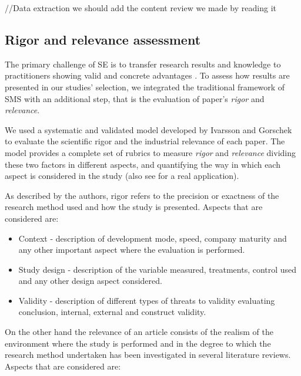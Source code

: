 \documentclass[final,5p,times,twocolumn]{elsarticle}
\begin{document}
//Data extraction we should add the content review we made by reading it




\subsection{Rigor and relevance assessment} %
\label{sub:rigor_and_relevance}

The primary challenge of SE is to transfer research results and knowledge to practitioners showing valid and concrete advantages  \cite{Ivarsson2010}. To assess how results are presented in our studies’ selection, we integrated the traditional framework of SMS with an additional step, that is the evaluation of paper’s \textit{rigor} and \textit{relevance}.

We used a systematic and validated model developed by Ivarsson and Gorschek \cite{Ivarsson2010} to evaluate the scientific rigor and the industrial relevance of each paper. The model provides a complete set of rubrics to measure \textit{rigor} and \textit{relevance} dividing these two factors in different aspects, and quantifying the way in which each aspect is considered in the study (also see \cite{IvarssonGorsREj} for a real application).

As described by the authors, rigor refers to the precision or exactness of the research method used and how the study is presented. Aspects that are considered are:

\begin{itemize}

\item Context - description of development mode, speed, company maturity and any other important aspect where the evaluation is performed.
\item Study design - description of the variable measured, treatments, control used and any other design aspect considered.
\item Validity - description of different types of threats to validity evaluating conclusion, internal, external and construct validity.
\end {itemize}


On the other hand the relevance of an article consists of the realism of the environment where the study is performed and in the degree to which the research method undertaken has been investigated in several literature reviews. Aspects that are considered are:
\end{document}
